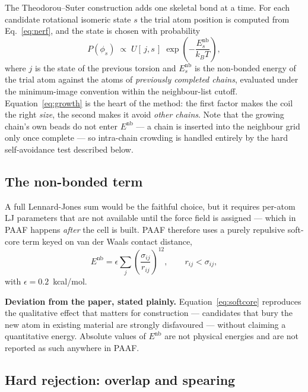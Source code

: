 \documentclass[11pt,a4paper]{article}
\begin{document}
The Theodorou--Suter construction adds one skeletal bond at a time. For each
candidate rotational isomeric state $s$ the trial atom position is computed
from Eq.~\eqref{eq:nerf}, and the state is chosen with probability
\begin{equation}
  P(\phi_s) \;\propto\; U[\,j, s\,]\;
  \exp\!\left(-\frac{E^{\text{nb}}_{s}}{k_B T}\right),
  \label{eq:growth}
\end{equation}
where $j$ is the state of the previous torsion and $E^{\text{nb}}_{s}$ is the
non-bonded energy of the trial atom against the atoms of \emph{previously
completed chains}, evaluated under the minimum-image convention within the
neighbour-list cutoff. Equation~\eqref{eq:growth} is the heart of the method:
the first factor makes the coil the right \emph{size}, the second makes it
avoid \emph{other chains}. Note that the growing chain's own beads do not
enter $E^{\text{nb}}$ --- a chain is inserted into the neighbour grid only
once complete --- so intra-chain crowding is handled entirely by the hard
self-avoidance test described below.

\subsection{The non-bonded term}

A full Lennard-Jones sum would be the faithful choice, but it requires
per-atom LJ parameters that are not available until the force field is
assigned --- which in PAAF happens \emph{after} the cell is built. PAAF
therefore uses a purely repulsive soft-core term keyed on van der Waals
contact distance,
\begin{equation}
  E^{\text{nb}} = \epsilon \sum_{j}
  \left(\frac{\sigma_{ij}}{r_{ij}}\right)^{12},
  \qquad r_{ij} < \sigma_{ij},
  \label{eq:softcore}
\end{equation}
with $\epsilon = 0.2$~kcal/mol.

\begin{caveat}
\textbf{Deviation from the paper, stated plainly.}
Equation~\eqref{eq:softcore} reproduces the qualitative effect that matters
for construction --- candidates that bury the new atom in existing material
are strongly disfavoured --- without claiming a quantitative energy. Absolute
values of $E^{\text{nb}}$ are not physical energies and are not reported as
such anywhere in PAAF.
\end{caveat}

\subsection{Hard rejection: overlap and spearing}
\end{document}

